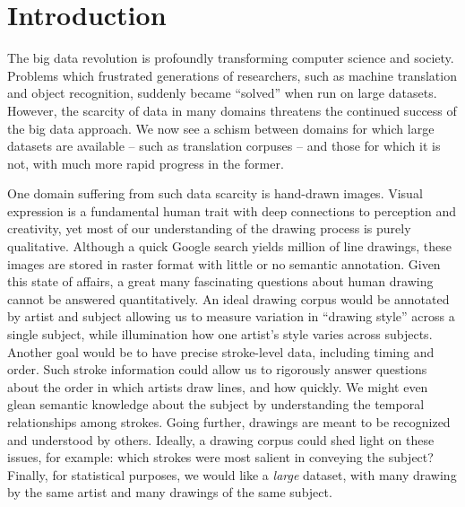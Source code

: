 \section{Introduction}

The big data revolution is profoundly transforming computer science
and society. Problems which frustrated generations of researchers,
such as machine translation and object recognition, suddenly became
``solved'' when run on large datasets. However, the scarcity of data
in many domains threatens the continued success of the big data
approach. We now see a schism between domains for which large
datasets are available – such as translation corpuses – and
those for which it is not, with much more rapid progress in the
former.

One domain suffering from such data scarcity is hand-drawn images.
Visual expression is a fundamental human trait with deep connections
to perception and creativity, yet most of our understanding of the
drawing process is purely qualitative. Although a quick Google
search yields million of line drawings, these images are stored in
raster format with little or no semantic annotation. Given this
state of affairs, a great many fascinating questions about human
drawing cannot be answered quantitatively. An ideal drawing corpus
would be annotated by artist and subject allowing us to measure
variation in ``drawing style'' across a single subject, while
illumination how one artist's style varies across subjects. Another
goal would be to have precise stroke-level data, including timing
and order. Such stroke information could allow us to rigorously
answer questions about the order in which artists draw lines, and
how quickly. We might even glean semantic knowledge about the
subject by understanding the temporal relationships among strokes.
Going further, drawings are meant to be recognized and understood by
others. Ideally, a drawing corpus could shed light on these issues,
for example: which strokes were most salient in conveying the
subject? Finally, for statistical purposes, we would like a
\emph{large} dataset, with many drawing by the same artist and many
drawings of the same subject.

